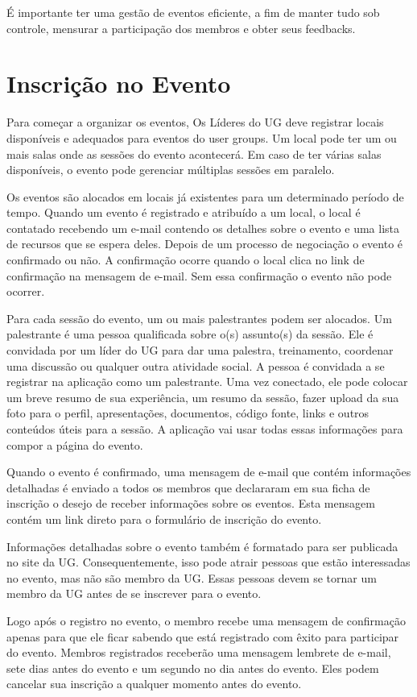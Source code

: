 \documentclass[envcountsame,envcountchap]{svmono}
\begin{document}
É importante ter uma gestão de eventos eficiente, a fim de manter tudo sob controle, mensurar a participação dos membros e obter seus feedbacks.

\section{Inscrição no Evento}

Para começar a organizar os eventos, Os Líderes do UG deve registrar locais disponíveis e adequados para eventos do user groups. Um local pode ter um ou mais salas onde as sessões do evento acontecerá. Em caso de ter várias salas disponíveis, o evento pode gerenciar múltiplas sessões em paralelo.

Os eventos são alocados em locais já existentes para um determinado período de tempo. Quando um evento é registrado e atribuído a um local, o local é contatado recebendo um e-mail contendo os detalhes sobre o evento e uma lista de recursos que se espera deles. Depois de um processo de negociação o evento é confirmado ou não. A confirmação ocorre quando o local clica no link de confirmação na mensagem de e-mail. Sem essa confirmação o evento não pode ocorrer.

Para cada sessão do evento, um ou mais palestrantes podem ser alocados. Um palestrante é uma pessoa qualificada sobre o(s) assunto(s) da sessão. Ele é convidada por um líder do UG para dar uma palestra, treinamento, coordenar uma discussão ou qualquer outra atividade social. A pessoa é convidada a se registrar na aplicação como um palestrante. Uma vez conectado, ele pode colocar um breve resumo de sua experiência, um resumo da sessão, fazer upload da sua foto para o perfil, apresentações, documentos, código fonte, links e outros conteúdos úteis para a sessão. A aplicação vai usar todas essas informações para compor a página do evento.

Quando o evento é confirmado, uma mensagem de e-mail que contém informações detalhadas é enviado a todos os membros que declararam em sua ficha de inscrição o desejo de receber informações sobre os eventos. Esta mensagem contém um link direto para o formulário de inscrição do evento.

Informações detalhadas sobre o evento também é formatado para ser publicada no site da UG. Consequentemente, isso pode atrair pessoas que estão interessadas no evento, mas não são membro da UG. Essas pessoas devem se tornar um membro da UG antes de se inscrever para o evento.

Logo após o registro no evento, o membro recebe uma mensagem de confirmação apenas para que ele ficar sabendo que está registrado com êxito para participar do evento. Membros registrados receberão uma mensagem lembrete de e-mail, sete dias antes do evento e um segundo no dia antes do evento. Eles podem cancelar sua inscrição a qualquer momento antes do evento.
\end{document}
